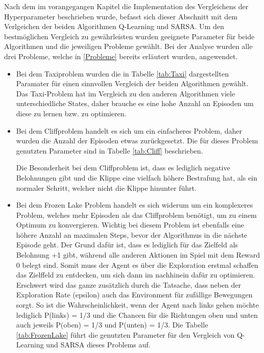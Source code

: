 Nach dem im vorangegangen Kapitel die Implementation des Vergleichens der Hyperparameter beschrieben wurde, befasst sich dieser Abschnitt mit dem Verlgeichen der beiden Algorithmen Q-Learning und SARSA. 
Um den bestmöglichen Vergleich zu gewährleisten wurden geeignete Parameter für beide Algorithmen und die jeweiligen Probleme gewählt. Bei der Analyse wurden alle drei Probleme, welche in \ref{Probleme} bereits erläutert wurden, angewendet.


\begin{itemize}
    \item Bei dem Taxiproblem wurden die in Tabelle \ref{tab:Taxi} dargestellten Paramater für einen sinnvollen Vergleich der beiden Algorithmen gewählt. Das Taxi-Problem hat im Vergleich zu den anderen Algorithmen viele unterschiedliche States, daher brauche es eine hohe Anzahl an Episoden um diese zu lernen bzw. zu optimieren.
    
    \item Bei dem Cliffproblem handelt es sich um ein einfacheres Problem, daher wurden die Anzahl der Episoden etwas zurückgesetzt. Die für dieses Problem genutzten Parameter sind in Tabelle \ref{tab:Cliff} beschrieben.
    
    Die Besonderheit bei dem Cliffproblem ist, dass es lediglich negative Belohnungen gibt und die Klippe eine vielfach höhere Bestrafung hat, als ein normaler Schritt, welcher nicht die Klippe hinunter führt. 

    \item Bei dem Frozen Lake Problem handelt es sich widerum um ein komplexeres Problem, welches mehr Episoden als das Cliffproblem benötigt, um zu einem Optimum zu konvergieren. Wichtig bei diesem Problem ist ebenfalls eine höhere Anzahl an maximalen Steps, bevor der Algorithmus in die nächste Episode geht. 
    Der Grund dafür ist, dass es lediglich für das Zielfeld als Belohnung +1 gibt, während alle anderen Aktionen im Spiel mit dem Reward 0 belegt sind. Somit muss der Agent es über die Exploration erstmal schaffen das Zielffeld zu entdecken, um sich dann im nachhinein dafür zu optimieren. 
    Erschwert wird das ganze zusätzlich durch die Tatsache, dass neben der Exploration Rate (epsilon) auch das Environment für zufällige Bewegungen sorgt. So ist die Wahrscheinlichkeit, wenn der Agent nach links gehen möchte lediglich P(links) = 1/3 und die Chancen für die Richtungen oben und unten auch jeweils P(oben) = 1/3 und P(unten) = 1/3. 
    Die Tabelle \ref{tab:FrozenLake} führt die genutzten Parameter für den Vergleich von Q-Learning und SARSA dieses Problems auf.
   

\end{itemize}

